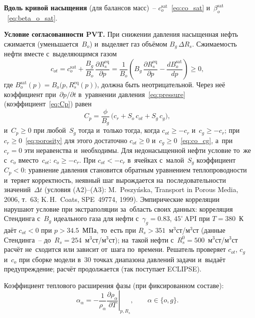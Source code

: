 \documentclass[12pt,a4paper]{article}
\newcommand{\csat}{c_o^{\mathrm{sat}}}
\newcommand{\bsat}{\beta_o^{\mathrm{sat}}}
\begin{document}
\textbf{Вдоль кривой насыщения} (для балансов масс)~--
$\csat$~\eqref{eq:co_sat} и~$\bsat$~\eqref{eq:beta_o_sat}.

\textbf{Условие согласованности PVT.} При снижении давления насыщенная
нефть сжимается (уменьшается~$B_o$) и~выделяет газ объёмом
$B_g\,\Delta R_s$. Сжимаемость нефти вместе с~выделяющимся газом
\begin{equation}\label{eq:c_ot}
  \boxed{
    c_{ot} = \csat + \frac{B_g}{B_o}\,\frac{\partial R_s^{\text{eq}}}{\partial p}
    = \frac{1}{B_o}\left(B_g\,\frac{\partial R_s^{\text{eq}}}{\partial p}
      - \frac{d B_o^{\text{sat}}}{d p}\right) \ge 0,
  }
\end{equation}
где $B_o^{\text{sat}}(p) = B_o\bigl(p, R_s^{\text{eq}}(p)\bigr)$, должна быть
неотрицательной. Через неё коэффициент при~$\partial p/\partial t$
в~уравнении давления~\eqref{eq:pressure} (коэффициент~\eqref{eq:Cp}) равен
\[
  C_p = \frac{\phi}{B_g}\,\bigl(c_r + S_o\,c_{ot} + S_g\,c_g\bigr),
\]
и~$C_p \ge 0$ при любой~$S_g$ тогда и~только тогда, когда
$c_{ot} \ge -c_r$ и~$c_g \ge -c_r$; при $c_r \ge 0$~\eqref{eq:porosity}
для этого достаточно $c_{ot} \ge 0$ и~$c_g \ge 0$~\eqref{eq:co_cg},
а~при $c_r = 0$ эти неравенства и~необходимы. Для недонасыщенной нефти
условие то~же с~$c_o$ вместо~$c_{ot}$: $c_o \ge -c_r$. При $c_{ot} < -c_r$ в~ячейках
с~малой~$S_g$ коэффициент $C_p < 0$: уравнение давления становится обратным
уравнением теплопроводности и~теряет корректность, неявный шаг вырождается
на~последовательности значений~$\Delta t$ (условия (A2)--(A3):
M.~Peszy\'nska, Transport in Porous Media, 2006, т.~63; K.\,H.~Coats,
SPE~49774, 1999). Эмпирические корреляции нарушают условие при экстраполяции
за~область своих данных: корреляция Стендинга с~$B_g$ идеального газа для
нефти с~$\gamma_g = 0.83$, $45^\circ$\,API при $T = 380$~К даёт
$c_{ot} < 0$ при $p > 34.5$~МПа, то~есть при $R_s > 351$~м$^3$ст/м$^3$ст
(данные Стендинга~-- до~$R_s = 254$~м$^3$ст/м$^3$ст); на~такой нефти
с~$R_s^0 = 500$~м$^3$ст/м$^3$ст расчёт не~сходится или зависит от~шага
по~времени. Решатель проверяет $c_{ot}$, $c_g$ и~$c_o$ при сборке модели
в~30 точках диапазона давлений задачи и~выдаёт предупреждение; расчёт
продолжается (так поступает ECLIPSE).

Коэффициент теплового расширения фазы (при фиксированном составе):
\begin{equation}\label{eq:thermal_expansion}
  \alpha_\alpha = -\frac{1}{\rho_\alpha}
    \left.\frac{\partial\rho_\alpha}{\partial T}\right|_{p,R_s},
    \qquad \alpha \in \{o, g\}.
\end{equation}
\end{document}
